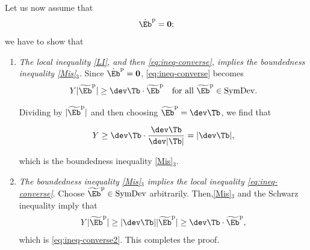 \bigskip
\noindent Let us now assume  that
\begin{equation}
	\dot{\Eb}^{\rm p} = \mathbf{0};
\end{equation}
we have to show that
\begin{enumerate}
	\item \textit{  The local inequality \eqref{LI}, and then \eqref{eq:ineq-converse}, implies the boundedness inequality \eqref{Mis}$_3$}.
Since $\dot{\Eb}^{\rm p}=\mathbf{0}$,   \eqref{eq:ineq-converse} becomes
\begin{equation}
	Y |\widetilde{\Eb}^{\rm p}| \geq \dev\Tb \cdot \widetilde{\Eb}^{\rm p} \quad \text{for all } \widetilde{\Eb}^{\rm p} \in \mathrm{SymDev}.
\end{equation}

Dividing by $|\widetilde{\Eb}^{\rm p}|$ and then choosing $\widetilde{\Eb}^{\rm p} = \dev\Tb$, we find that

\begin{equation}\label{eq:ineq-converse2}
	Y \geq \dev\Tb\cdot \frac{\dev\Tb}{\dev|\Tb|} = |\dev\Tb|,
\end{equation}

which is the boundedness inequality  \eqref{Mis}$_3$. 

\item  \textit{The boundedness inequality \eqref{Mis}$_3$ implies the local inequality \eqref{eq:ineq-converse}}.
 Choose $\widetilde{\Eb}^{\rm p} \in \mathrm{SymDev}$ arbitrarily. Then,\eqref{Mis}$_3$ and the Schwarz inequality imply that
\[
Y |\widetilde{\Eb}^{\rm p}| \geq |\dev\Tb||\widetilde{\Eb}^{\rm p}| \geq \dev\Tb\cdot \widetilde{\Eb}^{\rm p},
\]
which is \eqref{eq:ineq-converse2}. This completes the proof.

\end{enumerate}
%
